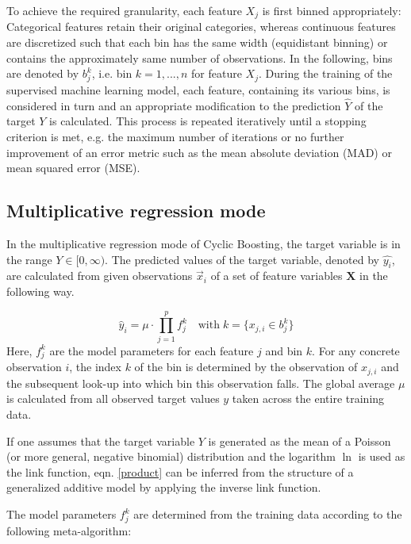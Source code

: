 \documentclass[BCOR=1mm, DIV=calc,10pt,
twoside=true,
twocolumn,
headings=normal]{scrartcl}
\begin{document}
To achieve the required granularity, each feature $X_j$ is first binned appropriately:
Categorical features retain their original categories, whereas continuous features are
discretized such that each bin has the same width (equidistant binning) or contains the
approximately same number of observations. In the following, bins are denoted by $b^k_j$,
i.e. bin $k = 1,..., n$ for feature $X_j$. During the training of the supervised machine
learning model, each feature, containing its various bins, is considered in turn and an
appropriate modification to the prediction $\hat{Y}$ of the target $Y$ is calculated. This
process is repeated iteratively until a stopping criterion is met, e.g. the maximum number
of iterations or no further improvement of an error metric such as the mean absolute
deviation (MAD) or mean squared error (MSE).


\subsection{Multiplicative regression mode}

In the multiplicative regression mode of Cyclic Boosting, the target variable is in the
range $Y \in [0,\infty)$. The predicted values of the target variable, denoted by
$\hat{y_i}$, are calculated from given observations $\vec{x}_i$ of a set of feature
variables $\bm{X}$ in the following way.

\begin{equation} \label{product}
\hat{y}_i = \mu \cdot \prod \limits_{j=1}^p f^k_j \quad \text{with}\; k=\{ x_{j,i} \in b^k_j\}
\end{equation}
Here, $f^k_j$ are the model parameters for each feature $j$ and bin $k$. For any concrete
observation $i$, the index $k$ of the bin is determined by the observation of $x_{j,i}$
and the subsequent look-up into which bin this observation falls. The global average $\mu$
is calculated from all observed target values $y$ taken across the entire training data.

If one assumes that the target variable $Y$ is generated as the mean of a Poisson (or more
general, negative binomial) distribution and the logarithm  $\ln$ is used as the link
function, eqn. \ref{product} can be inferred from the structure of a generalized additive
model by applying the inverse link function.

The model parameters $f^k_j$ are determined from the training data according to the
following meta-algorithm:
\end{document}
